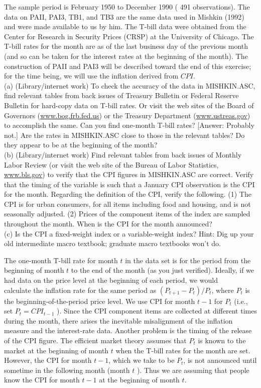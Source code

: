 \documentclass[10pt]{article}
\begin{document}
The sample period is February 1950 to December 1990 ( 491 observations). The data on PAII, PAI3, TB1, and TB3 are the same data used in Mishkin (1992) and were made available to us by him. The T-bill data were obtained from the Center for Research in Security Prices (CRSP) at the University of Chicago. The T-bill rates for the month are as of the last business day of the previous month (and so can be taken for the interest rates at the beginning of the month). The construction of PAII and PAI3 will be described toward the end of this exercise; for the time being, we will use the inflation derived from $C P I$.\\
(a) (Library/internet work) To check the accuracy of the data in MISHKIN.ASC, find relevant tables from back issues of Treasury Bulletin or Federal Reserve Bulletin for hard-copy data on T-bill rates. Or visit the web sites of the Board of Governors (\href{http://www.bog.frb.fed.us}{www.bog.frb.fed.us}) or the Treasury Department (\href{http://www.ustreas.gov}{www.ustreas.gov}) to accomplish the same. Can you find one-month T-bill rates? [Answer: Probably not.] Are the rates in MISHKIN.ASC close to those in the relevant tables? Do they appear to be at the beginning of the month?\\
(b) (Library/internet work) Find relevant tables from back issues of Monthly Labor Review (or visit the web site of the Bureau of Labor Statistics, \href{http://www.bls.gov}{www.bls.gov}) to verify that the CPI figures in MISHKIN.ASC are correct. Verify that the timing of the variable is such that a January CPI observation is the CPI for the month. Regarding the definition of the CPI, verify the following. (1) The CPI is for urban consumers, for all items including food and housing, and is not seasonally adjusted. (2) Prices of the component items of the index are sampled throughout the month. When is the CPI for the month announced?\\
(c) Is the CPI a fixed-weight index or a variable-weight index? Hint: Dig up your old intermediate macro textbook; graduate macro textbooks won't do.

The one-month T-bill rate for month $t$ in the data set is for the period from the beginning of month $t$ to the end of the month (as you just verified). Ideally, if we had data on the price level at the beginning of each period, we would\\
calculate the inflation rate for the same period as $\left(P_{t+1}-P_{t}\right) / P_{t}$, where $P_{t}$ is the beginning-of-the-period price level. We use CPI for month $t-1$ for $P_{t}$ (i.e., set $P_{t}=C P I_{t-1}$ ). Since the CPI component items are collected at different times during the month, there arises the inevitable misalignment of the inflation measure and the interest-rate data. Another problem is the timing of the release of the CPI figure. The efficient market theory assumes that $P_{t}$ is known to the market at the beginning of month $t$ when the T-bill rates for the month are set. However, the CPI for month $t-1$, which we take to be $P_{t}$, is not announced until sometime in the following month (month $t$ ). Thus we are assuming that people know the CPI for month $t-1$ at the beginning of month $t$.
\end{document}
